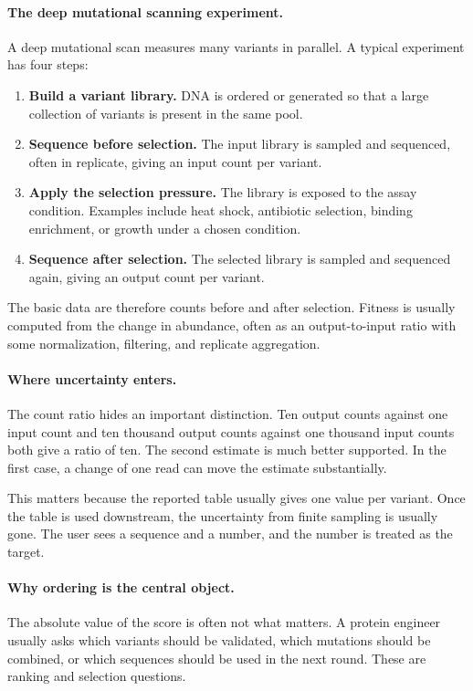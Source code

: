 \documentclass[11pt]{article}
\begin{document}
\paragraph{The deep mutational scanning experiment.}
A deep mutational scan measures many variants in parallel. A typical experiment has four steps:
\begin{enumerate}
  \item \textbf{Build a variant library.} DNA is ordered or generated so that a large collection of variants is present in the same pool.
  \item \textbf{Sequence before selection.} The input library is sampled and sequenced, often in replicate, giving an input count per variant.
  \item \textbf{Apply the selection pressure.} The library is exposed to the assay condition. Examples include heat shock, antibiotic selection, binding enrichment, or growth under a chosen condition.
  \item \textbf{Sequence after selection.} The selected library is sampled and sequenced again, giving an output count per variant.
\end{enumerate}

The basic data are therefore counts before and after selection. Fitness is usually computed from the change in abundance, often as an output-to-input ratio with some normalization, filtering, and replicate aggregation.

\paragraph{Where uncertainty enters.}
The count ratio hides an important distinction. Ten output counts against one input count and ten thousand output counts against one thousand input counts both give a ratio of ten. The second estimate is much better supported. In the first case, a change of one read can move the estimate substantially.

This matters because the reported table usually gives one value per variant. Once the table is used downstream, the uncertainty from finite sampling is usually gone. The user sees a sequence and a number, and the number is treated as the target.

\paragraph{Why ordering is the central object.}
The absolute value of the score is often not what matters. A protein engineer usually asks which variants should be validated, which mutations should be combined, or which sequences should be used in the next round. These are ranking and selection questions.
\end{document}
